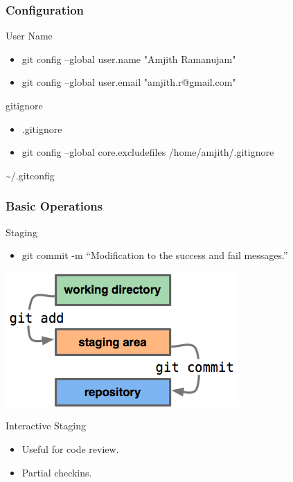 \documentclass[10pt]{beamer}
\begin{document}
\begin{frame}
    \frametitle{Configuration}
    \begin{block}{User Name}
        \begin{itemize}
            \item git config --global user.name "Amjith Ramanujam"   \\
            \item git config --global user.email "amjith.r@gmail.com"\\
        \end{itemize}
    \end{block}
    \pause
    \begin{block}{gitignore}
        \begin{itemize}
            \item .gitignore\\ 
            \item git config --global core.excludefiles /home/amjith/.gitignore\\
        \end{itemize}
    \end{block}
    \textasciitilde/.gitconfig
\end{frame}

\begin{frame}
    \frametitle{Basic Operations}
    \begin{block}{Staging}
        \begin{itemize}
            \item git commit -m ``Modification to the success and fail messages.''
        \end{itemize}
    \end{block}
    \begin{center}\includegraphics{images/index1.png}\end{center}
    \pause
    \begin{block}{Interactive Staging}
        \begin{itemize}
            \item Useful for code review.
            \item Partial checkins. 
        \end{itemize}
    \end{block}
\end{frame}
\end{document}
